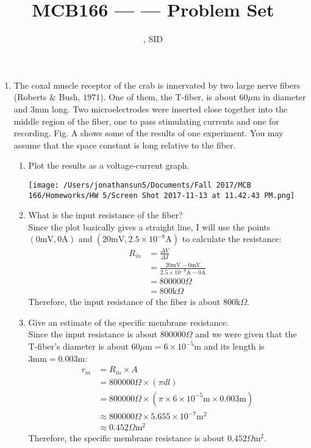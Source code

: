 \documentclass[11pt]{article}
\title{MCB166 --- \Session --- Problem Set \Homework}
\author{\Name, SID \SID}
\date{\displaydate{date}}
\begin{document}
\maketitle

\newpage
\begin{enumerate}[label=\arabic*.]
\item
The coxal muscle receptor of the crab is innervated by two large nerve fibers (Roberts \& Bush, $1971$). One of them, the T-fiber, is about $60 \mu \text{m}$ in diameter and $3 \text{mm}$ long. Two microelectrodes were inserted close together into the middle region of the fiber, one to pass stimulating currents and one for recording. Fig. A shows some of the results of one experiment. You may assume that the space constant is long relative to the fiber.
\begin{enumerate}[label=(\alph*)]
\item
Plot the results as a voltage-current graph.
\begin{center}
\texttt{[image: /Users/jonathansun5/Documents/Fall 2017/MCB 166/Homeworks/HW 5/Screen Shot 2017-11-13 at 11.42.43 PM.png]}
\end{center}



\item
What is the input resistance of the fiber?
\vspace*{1\baselineskip}
\\
Since the plot basically gives a straight line, I will use the points $\left(0 \text{mV}, 0 \text{A}\right)$ and $\left(20 \text{mV}, 2.5 \times 10^{-8} \text{A}\right)$ to calculate the resistance:
\begin{align*}
R_{in} &= \frac{\Delta V} {\Delta I} \\
&= \frac{20 \text{mV} - 0 \text{mV}} {2.5 \times 10^{-8} \text{A} - 0 \text{A}} \\
&= 800000 \Omega \\
&= 800 \text{k}\Omega
\end{align*}
Therefore, the input resistance of the fiber is about $800 \text{k}\Omega$.



\item
Give an estimate of the specific membrane resistance.
\vspace*{1\baselineskip}
\\
Since the input resistance is about $800000 \Omega$ and we were given that the T-fiber's diameter is about $60 \mu \text{m} = 6 \times 10^{-5} \text{m}$ and its length is $3 \text{mm} = 0.003 \text{m}$:
\begin{align*}
r_m &= R_{in} \times A \\
&= 800000 \Omega \times \left(\pi d l\right) \\
&= 800000 \Omega \times \left(\pi \times 6 \times 10^{-5} \text{m} \times 0.003 \text{m}\right) \\
&\approx 800000 \Omega \times 5.655 \times 10^{-7} \text{m}^2 \\
&\approx 0.452 \Omega \text{m}^2
\end{align*}
Therefore, the specific membrane resistance is about $0.452 \Omega \text{m}^2$.




\end{enumerate}
\end{enumerate}
\end{document}
